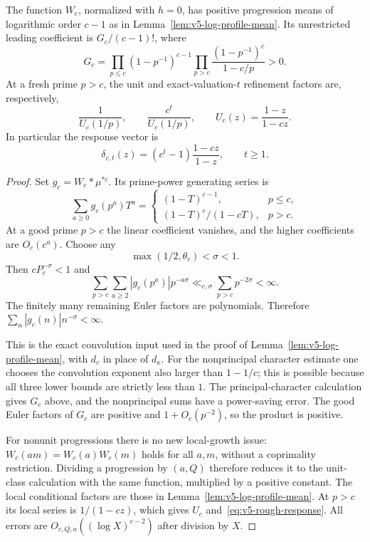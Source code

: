 \begin{lemma}
\label{lem:v5-rough-mean}
The function $W_c$, normalized with $h=0$, has positive progression
means of logarithmic order $c-1$ as in
Lemma~\ref{lem:v5-log-profile-mean}.  Its unrestricted leading
coefficient is $G_c/(c-1)!$, where
\[
 G_c=
 \prod_{p\leq c}(1-p^{-1})^{c-1}
 \prod_{p>c}\frac{(1-p^{-1})^c}{1-c/p}>0.
\]
At a fresh prime $p>c$, the unit and exact-valuation-$t$ refinement
factors are, respectively,
\[
 \frac1{U_c(1/p)},\qquad\frac{c^t}{U_c(1/p)},
 \qquad U_c(z)=\frac{1-z}{1-cz}.
\]
In particular the response vector is
\begin{equation}\label{eq:v5-rough-response}
 \delta_{c,t}(z)=(c^t-1)\frac{1-cz}{1-z},\qquad t\geq1.
\end{equation}
\end{lemma}

\begin{proof}
Set $g_c=W_c*\mu^{*c}$.  Its prime-power generating series is
\[
 \sum_{a\geq0}g_c(p^a)T^a=
 \begin{cases}
 (1-T)^{c-1},&p\leq c,\\
 (1-T)^c/(1-cT),&p>c.
 \end{cases}
\]
At a good prime $p>c$ the linear coefficient vanishes, and the
higher coefficients are $O_c(c^a)$.  Choose any
\[
 \max(1/2,\theta_c)<\sigma<1.
\]
Then $cP_c^{-\sigma}<1$ and
\[
 \sum_{p>c}\sum_{a\geq2}|g_c(p^a)|p^{-a\sigma}
 \ll_{c,\sigma}\sum_{p>c}p^{-2\sigma}<\infty.
\]
The finitely many remaining Euler factors are polynomials.  Therefore
$\sum_n|g_c(n)|n^{-\sigma}<\infty$.

This is the exact convolution input used in the proof of
Lemma~\ref{lem:v5-log-profile-mean}, with $d_c$ in place of
$d_\kappa$.  For the nonprincipal character estimate one chooses
the convolution exponent also larger than $1-1/c$; this is possible
because all three lower bounds are strictly less than $1$.
The principal-character calculation gives $G_c$ above, and the
nonprincipal sums have a power-saving error.  The good Euler factors
of $G_c$ are positive and $1+O_c(p^{-2})$, so the product is positive.

For nonunit progressions there is no new local-growth issue:
$W_c(am)=W_c(a)W_c(m)$ holds for all $a,m$, without a coprimality
restriction.  Dividing a progression by $(a,Q)$ therefore reduces it
to the unit-class calculation with the same function, multiplied by
a positive constant.  The local conditional factors are those in
Lemma~\ref{lem:v5-log-profile-mean}.  At $p>c$ its local series is
$1/(1-cz)$, which gives $U_c$ and~\eqref{eq:v5-rough-response}.
All errors are $O_{c,Q,a}((\log X)^{c-2})$ after division by $X$.
\end{proof}

